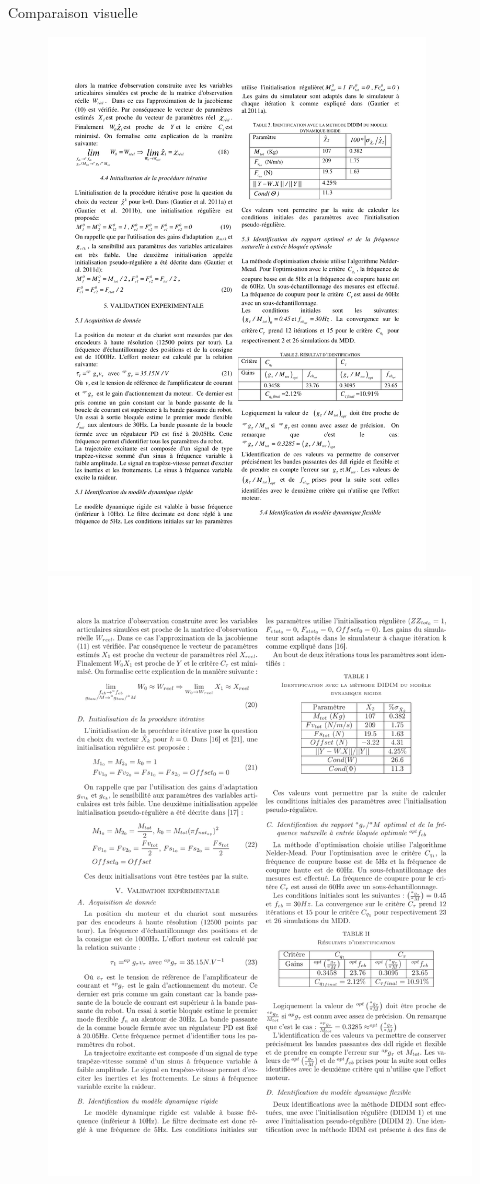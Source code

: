 \documentclass{beamer}
\begin{document}
\begin{frame}{Comparaison visuelle}

\begin{figure}
\centering
  \includegraphics[width= 10cm, trim = 0cm 22cm 0cm 0cm, clip]{img/cifa_word} 

\includegraphics[width=10 cm, trim = 0cm 21cm 0cm 0cm, clip]{img/cifa_latex}
\end{figure}

\end{frame}
\end{document}
